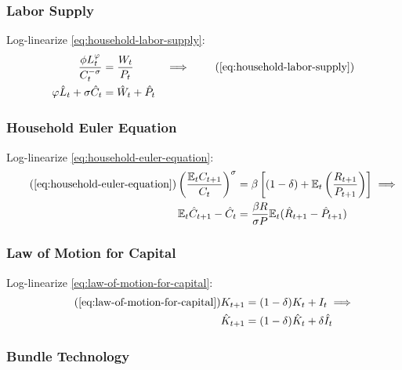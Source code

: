 \documentclass[
	12pt, 
	]{article}
\numberwithin{equation}{section}
\newcommand{\E}[1][t]{{\mathbb{E}_{#1}}}
\theoremstyle{definition}
\theoremstyle{plain}
\theoremstyle{plain}
\theoremstyle{plain}
\begin{document}

\subsubsection{Labor Supply}

Log-linearize \ref{eq:household-labor-supply}:
\begin{alignat}{2}
	\frac{\phi L_t^{\varphi}}{C_t^{-\sigma}} &= \frac{W_t}{P_t} & \implies \tag{\ref{eq:household-labor-supply}} \\
	\varphi \hat{L}_t + \sigma \hat{C}_t &= \hat{W}_t + \hat{P}_t & \label{eq:ll-labor-supply}
\end{alignat}


\subsubsection{Household Euler Equation}

Log-linearize \ref{eq:household-euler-equation}:
\begin{align}
\tag{\ref{eq:household-euler-equation}}
	\left( \frac{\mathbb{E}_t C_{t+1}}{C_t} \right)^\sigma &= \beta \left[ (1-\delta) + \mathbb{E}_t \left(\frac{R_{t+1}}{P_{t+1}}\right) \right] \implies \\
\label{eq:ll-household-euler-equation}
	\E \hat{C}_{t+1} - \hat{C}_t &= \frac{\beta R}{\sigma P} \E(\hat{R}_{t+1} - \hat{P}_{t+1})
\end{align}


\subsubsection{Law of Motion for Capital}

Log-linearize \ref{eq:law-of-motion-for-capital}:
\begin{align}
\tag{\ref{eq:law-of-motion-for-capital}}
	K_{t+1} &= (1-\delta)K_t + I_t \implies \\
\label{eq:ll-law-of-motion-for-capital}
	\hat{K}_{t+1} &= (1-\delta)\hat{K}_t + \delta \hat{I}_t
\end{align}


\subsubsection{Bundle Technology}
\end{document}
